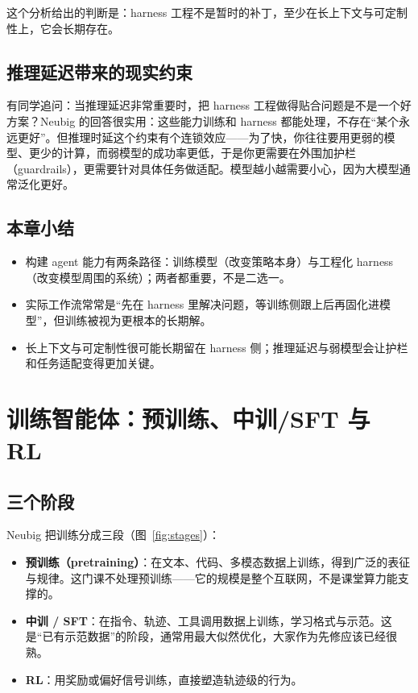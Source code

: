 \documentclass[a4paper]{article}
\begin{document}
这个分析给出的判断是：harness 工程不是暂时的补丁，至少在长上下文与可定制性上，它会长期存在。

\subsection{推理延迟带来的现实约束}

有同学追问：当推理延迟非常重要时，把 harness 工程做得贴合问题是不是一个好方案？Neubig 的回答很实用：这些能力训练和 harness 都能处理，不存在“某个永远更好”。但推理时延这个约束有个连锁效应——为了快，你往往要用更弱的模型、更少的计算，而弱模型的成功率更低，于是你更需要在外围加护栏（guardrails），更需要针对具体任务做适配。模型越小越需要小心，因为大模型通常泛化更好。

\subsection{本章小结}

\begin{itemize}
\item 构建 agent 能力有两条路径：训练模型（改变策略本身）与工程化 harness（改变模型周围的系统）；两者都重要，不是二选一。
\item 实际工作流常常是“先在 harness 里解决问题，等训练侧跟上后再固化进模型”，但训练被视为更根本的长期解。
\item 长上下文与可定制性很可能长期留在 harness 侧；推理延迟与弱模型会让护栏和任务适配变得更加关键。
\end{itemize}

\section{训练智能体：预训练、中训/SFT 与 RL}

\subsection{三个阶段}

Neubig 把训练分成三段（图~\ref{fig:stages}）：

\begin{itemize}
\item \textbf{预训练（pretraining）}：在文本、代码、多模态数据上训练，得到广泛的表征与规律。这门课不处理预训练——它的规模是整个互联网，不是课堂算力能支撑的。
\item \textbf{中训 / SFT}：在指令、轨迹、工具调用数据上训练，学习格式与示范。这是“已有示范数据”的阶段，通常用最大似然优化，大家作为先修应该已经很熟。
\item \textbf{RL}：用奖励或偏好信号训练，直接塑造轨迹级的行为。
\end{itemize}
\end{document}
